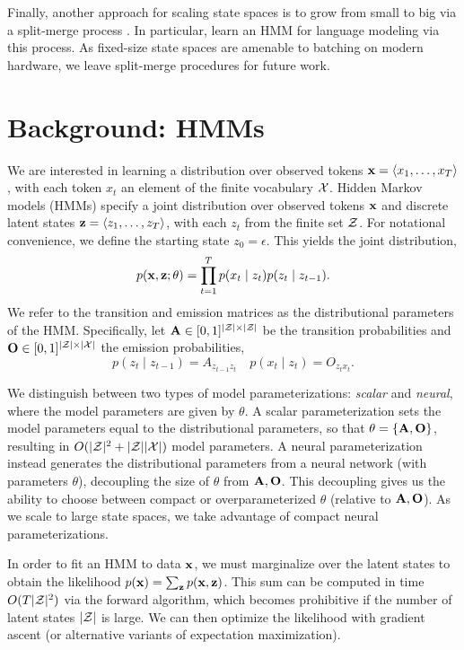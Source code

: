 \documentclass[11pt,a4paper]{article}
\begin{document}
Finally, another approach for scaling state spaces is to
grow from small to big via a split-merge process
\citep{petrov2006splitmerge,huang2011thesis}.
In particular, \citet{huang2011thesis} learn an HMM for language modeling
via this process.
As fixed-size state spaces are amenable to batching on modern hardware,
we leave split-merge procedures for future work. 

\section{Background: HMMs}

We are interested in learning a distribution over observed tokens
$\mathbf{x} = \langle x_1, \ldots, x_T \rangle$, with each token $x_t$
an element of the finite vocabulary $\mathcal{X}$.
Hidden Markov models (HMMs) specify a joint distribution over 
observed tokens $\mathbf{x}$ and discrete latent states $\mathbf{z} = \langle z_1, \ldots, z_T \rangle$,
with each $z_t$ from the finite set $\mathcal{Z}$.
For notational convenience, we define the starting state $z_0=\epsilon$.
This yields the joint distribution,
\begin{equation}
p(\mathbf{x}, \mathbf{z}; \theta)
= \prod_{t=1}^T p(x_t\mid z_t)p(z_t \mid z_{t-1}).
\end{equation}
\noindent We refer to the transition and emission matrices as the distributional parameters of the HMM.
Specifically, let $\mathbf{A} \in[0,1]^{|\mathcal{Z}|\times|\mathcal{Z}|}$ be the transition probabilities and
$\mathbf{O} \in[0,1]^{|\mathcal{Z}|\times|\mathcal{X}|}$ the emission probabilities,
\begin{equation}
p(z_t \mid z_{t-1}) = A_{z_{t-1}z_t}  \quad
p(x_t \mid z_t) = O_{z_tx_t}.
\end{equation}

We distinguish between two types of model parameterizations: \textit{scalar} and \textit{neural},
where the model parameters are given by $\theta$.
A scalar parameterization sets the model parameters equal to the distributional
parameters, so that $\theta = \left\{\mathbf{A}, \mathbf{O}\right\}$,
resulting in $O(|\mathcal{Z}|^2 + |\mathcal{Z}||\mathcal{X}|)$ model parameters.
A neural parameterization instead generates the distributional parameters
from a neural network (with parameters $\theta$),
decoupling the size of $\theta$ from $\mathbf{A},\mathbf{O}$.
This decoupling gives us the ability to choose
between compact or overparameterized $\theta$ (relative to $\mathbf{A},\mathbf{O}$).
As we scale to large state spaces,
we take advantage of compact neural parameterizations.

In order to fit an HMM to data $\mathbf{x}$,
we must marginalize over the latent states to obtain the likelihood
$p(\mathbf{x}) = \sum_{\mathbf{z}}p(\mathbf{x},\mathbf{z})$.
This sum can be computed in time $O(T|\mathcal{Z}|^2)$ via the forward algorithm,
which becomes prohibitive if the number of latent states $|\mathcal{Z}|$ is large.
We can then optimize the likelihood 
with gradient ascent (or alternative variants of expectation maximization).
\end{document}
